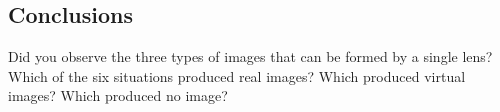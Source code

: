 \begin{multicols}{2}
\section{Conclusions}
Did you observe the three types of images that can be formed by a single lens? Which of the six situations produced real images? Which produced virtual images? Which produced no image?  


 \end{multicols}
\endinput
